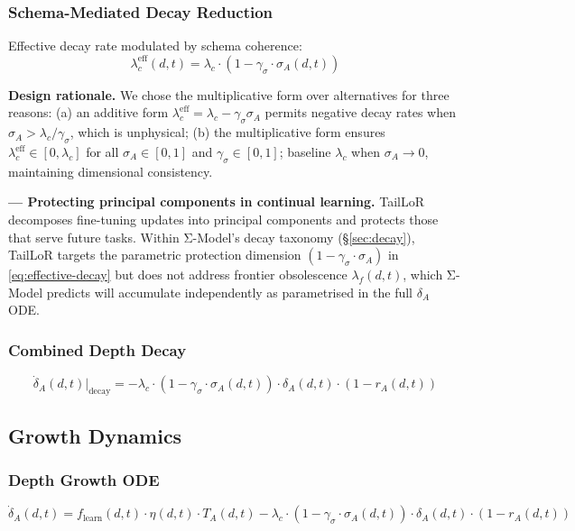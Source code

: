 \documentclass[10pt]{article}
\begin{document}
\subsubsection{Schema-Mediated Decay Reduction}

Effective decay rate modulated by schema coherence:
\begin{equation}\label{eq:effective-decay}
\lambda_c^{\text{eff}}(d,t) = \lambda_c \cdot (1 - \gamma_\sigma \cdot \sigma_A(d,t))
\end{equation}

\textbf{Design rationale.} We chose the multiplicative form over alternatives
for three reasons: (a) an additive form $\lambda_c^{\text{eff}} = \lambda_c - \gamma_\sigma \sigma_A$
permits negative decay rates when $\sigma_A > \lambda_c / \gamma_\sigma$, which is
unphysical; (b) the multiplicative form ensures $\lambda_c^{\text{eff}} \in [0, \lambda_c]$
for all $\sigma_A \in [0,1]$ and $\gamma_\sigma \in [0,1]$; %
baseline $\lambda_c$ when $\sigma_A \to 0$, maintaining dimensional consistency.

\textbf{\cite{taillor2026} --- Protecting principal components in continual learning.}
TailLoR decomposes fine-tuning updates into principal components and protects
those that serve future tasks. Within Σ-Model's decay taxonomy
(\S\ref{sec:decay}), TailLoR targets the parametric protection dimension
$(1 - \gamma_\sigma \cdot \sigma_A)$ in \eqref{eq:effective-decay} but does not
address frontier obsolescence $\lambda_f(d,t)$, which Σ-Model predicts will
accumulate independently as parametrised in the full $\delta_A$ ODE.

\subsubsection{Combined Depth Decay}
\begin{equation}\label{eq:depth-decay}
\dot{\delta}_A(d,t)\big|_{\text{decay}} = -\lambda_c \cdot (1 - \gamma_\sigma \cdot \sigma_A(d,t)) \cdot \delta_A(d,t) \cdot (1 - r_A(d,t))
\end{equation}

\subsection{Growth Dynamics}\label{sec:growth}

\subsubsection{Depth Growth ODE}
\begin{equation}\label{eq:depth-ode}
\dot{\delta}_A(d,t) = f_{\text{learn}}(d,t) \cdot \eta(d,t) \cdot T_A(d,t) - \lambda_c \cdot (1 - \gamma_\sigma \cdot \sigma_A(d,t)) \cdot \delta_A(d,t) \cdot (1 - r_A(d,t))
\end{equation}
\end{document}
